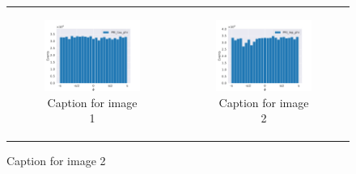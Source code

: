 \documentclass[../../main/main.tex]{subfiles}
\begin{document}
\begin{figure}
    \centering
    \begin{tabular}{cc}
        \begin{subfigure}[b]{0.50\textwidth}
            \centering
            \includegraphics[width=\textwidth]{../../plots/PRI_tau_phi.pdf}
            \caption{Caption for image 1}
            \label{fig:sub1}
        \end{subfigure} &
        \begin{subfigure}[b]{0.50\textwidth}
            \centering
            \includegraphics[width=\textwidth]{../../plots/PRI_lep_phi.pdf}
            \caption{Caption for image 2}
            \label{fig:sub2}
        \end{subfigure} \\

\end{tabular}
\end{figure}
\end{document}
